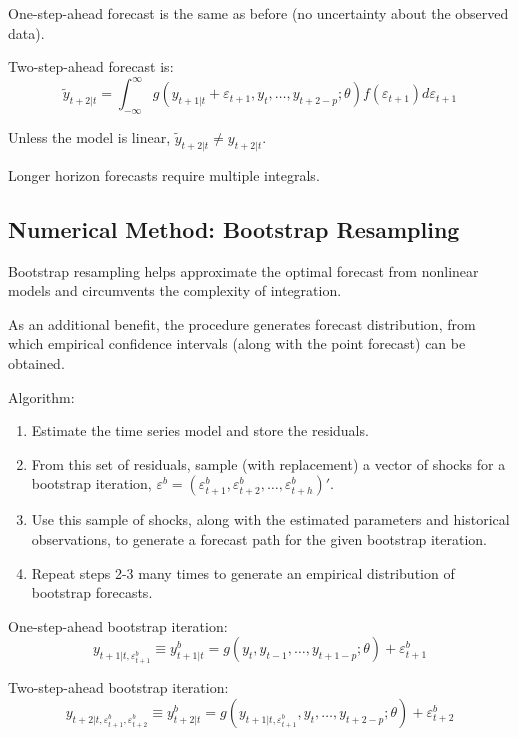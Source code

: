 \documentclass[
  oneside]{book}
\providecommand{\tightlist}{%
  \setlength{\itemsep}{0pt}\setlength{\parskip}{0pt}}
\begin{document}
One-step-ahead forecast is the same as before (no uncertainty about the observed data).

Two-step-ahead forecast is: \[\tilde{y}_{t+2|t} = \int_{-\infty}^{\infty}g(y_{t+1|t}+\varepsilon_{t+1},y_{t},\ldots,y_{t+2-p};\theta)f(\varepsilon_{t+1})d\varepsilon_{t+1}\]

Unless the model is linear, \(\tilde{y}_{t+2|t} \ne y_{t+2|t}\).

Longer horizon forecasts require multiple integrals.

\hypertarget{numerical-method-bootstrap-resampling}{%
\subsection{Numerical Method: Bootstrap Resampling}\label{numerical-method-bootstrap-resampling}}

Bootstrap resampling helps approximate the optimal forecast from nonlinear models and circumvents the complexity of integration.

As an additional benefit, the procedure generates forecast distribution, from which empirical confidence intervals (along with the point forecast) can be obtained.

Algorithm:

\begin{enumerate}
\def\labelenumi{\arabic{enumi}.}
\tightlist
\item
  Estimate the time series model and store the residuals.
\item
  From this set of residuals, sample (with replacement) a vector of shocks for a bootstrap iteration, \(\varepsilon^b = (\varepsilon_{t+1}^b,\varepsilon_{t+2}^b,\ldots,\varepsilon_{t+h}^b)'\).
\item
  Use this sample of shocks, along with the estimated parameters and historical observations, to generate a forecast path for the given bootstrap iteration.
\item
  Repeat steps 2-3 many times to generate an empirical distribution of bootstrap forecasts.
\end{enumerate}

One-step-ahead bootstrap iteration: \[y_{t+1|t,\varepsilon_{t+1}^b} \equiv y_{t+1|t}^b = g(y_{t},y_{t-1},\ldots,y_{t+1-p};\theta)+\varepsilon_{t+1}^b\]

Two-step-ahead bootstrap iteration: \[y_{t+2|t,\varepsilon_{t+1}^b,\varepsilon_{t+2}^b} \equiv y_{t+2|t}^b = g(y_{t+1|t,\varepsilon_{t+1}^b},y_{t},\ldots,y_{t+2-p};\theta)+\varepsilon_{t+2}^b\]
\end{document}
